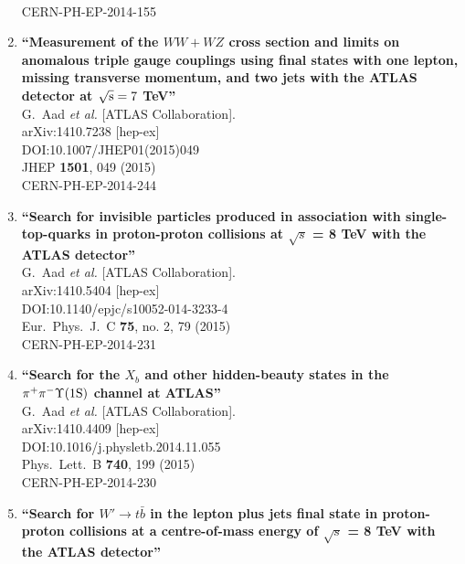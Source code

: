 \documentclass{article}
\begin{document}
\begin{enumerate}
  \\{}CERN-PH-EP-2014-155
\item%
{\bf ``Measurement of the $WW+WZ$ cross section and limits on anomalous triple gauge couplings using final states with one lepton, missing transverse momentum, and two jets with the ATLAS detector at $\sqrt{\rm{s}} = 7$ TeV''}
  \\{}G.~Aad {\it et al.} [ATLAS Collaboration].
  \\{}arXiv:1410.7238 [hep-ex]
  \\{}DOI:10.1007/JHEP01(2015)049
  \\{}JHEP {\bf 1501}, 049 (2015)
  \\{}CERN-PH-EP-2014-244
\item%
{\bf ``Search for invisible particles produced in association with single-top-quarks in proton-proton collisions at $\sqrt{s}$ = 8 TeV with the ATLAS detector''}
  \\{}G.~Aad {\it et al.} [ATLAS Collaboration].
  \\{}arXiv:1410.5404 [hep-ex]
  \\{}DOI:10.1140/epjc/s10052-014-3233-4
  \\{}Eur.\ Phys.\ J.\ C {\bf 75}, no. 2, 79 (2015)
  \\{}CERN-PH-EP-2014-231
\item%
{\bf ``Search for the $X_b$ and other hidden-beauty states in the $\pi^+ \pi^- \Upsilon(1 \rm S)$ channel at ATLAS''}
  \\{}G.~Aad {\it et al.} [ATLAS Collaboration].
  \\{}arXiv:1410.4409 [hep-ex]
  \\{}DOI:10.1016/j.physletb.2014.11.055
  \\{}Phys.\ Lett.\ B {\bf 740}, 199 (2015)
  \\{}CERN-PH-EP-2014-230
\item%
{\bf ``Search for $W' \to t\bar{b}$ in the lepton plus jets final state in proton-proton collisions at a centre-of-mass energy of $\sqrt{s}$ = 8 TeV with the ATLAS detector''}

\end{enumerate}
\end{document}
